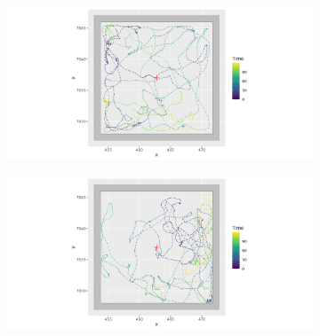 \documentclass[11pt]{article}
\newcommand {\1}{\mathbb{1}}
\theoremstyle{definition}
\theoremstyle{remark}
\theoremstyle{remark}
\begin{document}
\begin{figure}[H]
 	\begin{subfigure}{0.48\textwidth}
 		\centering
 		\includegraphics[scale=0.35]{images/crcvm/illustrative_sample_rect_standard}
 		\label{fig:illustrativesamplerectstandard}
 	\end{subfigure}
 	\begin{subfigure}{0.48\textwidth}
 		\centering
 		\includegraphics[scale=0.35]{images/crcvm/illustrative_sample_rect_pers}
 		\label{fig:illustrativesamplerectpers}
 	\end{subfigure}
 	

\end{figure}
\end{document}

